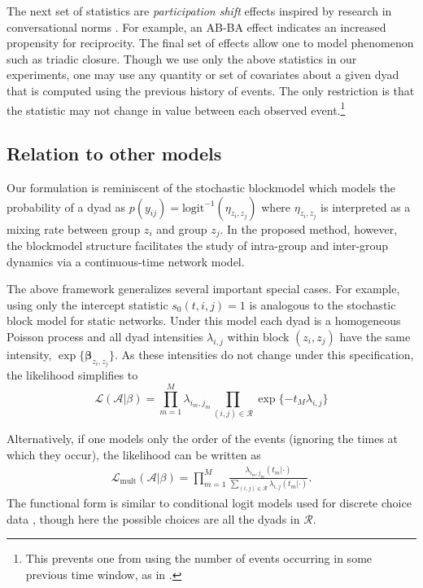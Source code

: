 \documentclass{article}
\begin{document}
The next set of statistics are \emph{participation shift} effects inspired by research in conversational norms \cite{Gibson2003}.  For example, an AB-BA effect indicates an increased propensity for reciprocity.  The final set of effects allow one to model phenomenon such as triadic closure.  Though we use only the above statistics in our experiments, one may use any quantity or set of covariates about a given dyad that is computed using the previous history of events.  The only restriction is that the statistic may not change in value between each observed event.\footnote{This prevents one from using the number of events occurring in some previous time window, as in \cite{Gunawardana2011}.}

\subsection{Relation to other models}

Our formulation is reminiscent of the stochastic blockmodel \cite{Nowicki2001,Kemp} which models the probability of a dyad as $p(y_{ij}) =\mbox{logit}^{-1}( \eta_{z_i,z_j})$ where $\eta_{z_i,z_j}$ is interpreted as a mixing rate between group $z_i$ and group $z_j$.  In the proposed method, however, the blockmodel structure facilitates the study of intra-group and inter-group dynamics via a continuous-time network model.

The above framework generalizes several important special cases. For example,  using only the intercept statistic $s_0(t,i,j) = 1$ is analogous to the stochastic block model for static networks.  Under this model each dyad is a homogeneous Poisson process and all dyad intensities $\lambda_{i,j}$ within block $(z_i,z_j)$ have the same intensity, $\exp\{\boldsymbol{\beta}_{z_i,z_j}\}$.  As these intensities do not change under this specification, the likelihood simplifies to 
$$\mathcal{L}(\mathcal{A}|\beta) = \prod_{m=1}^M \lambda_{i_m,j_m} \prod_{(i,j) \in \mathcal{R}} \exp\{-t_M \lambda_{i,j}\}$$

Alternatively, if one models only the order of the events (ignoring the times at which they occur), the likelihood can be written as
\begin{align}
\mathcal{L}_{\mbox{mult}}(\mathcal{A}|\beta) = \prod_{m=1}^M \frac{\lambda_{i_m,j_m}(t_m | \cdot)}{\sum_{(i,j) \in \mathcal{R}} \lambda_{i,j}(t_m | \cdot)}.
\label{eqn:multllk}
\end{align}
The functional form is similar to conditional logit models used for discrete choice data \cite{McFadden1984}, though here the possible choices are all the dyads in $\mathcal{R}$.
\end{document}
